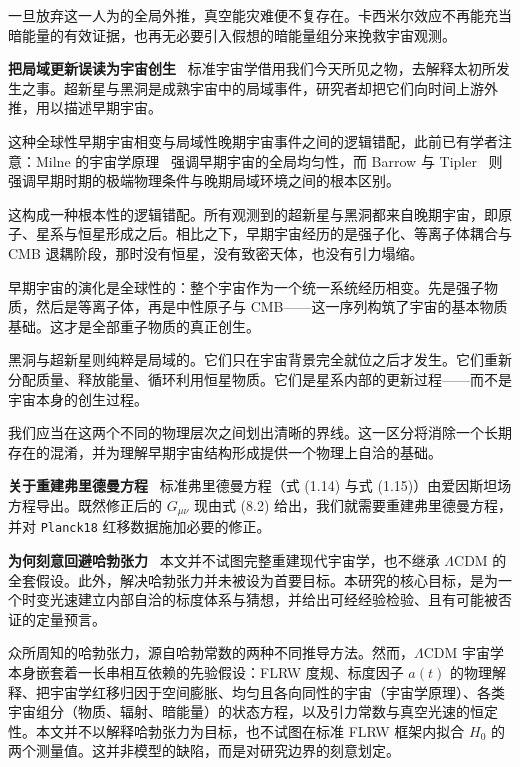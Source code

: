 \documentclass[12pt,leqno]{article}
\begin{document}
	\medskip
	一旦放弃这一人为的全局外推，真空能灾难便不复存在。卡西米尔效应不再能充当暗能量的有效证据，也再无必要引入假想的暗能量组分来挽救宇宙观测。

	
	\medskip
	\bigskip
	\textbf{把局域更新误读为宇宙创生}\,\,\,
	标准宇宙学借用我们今天所见之物，去解释太初所发生之事。超新星与黑洞是成熟宇宙中的局域事件，研究者却把它们向时间上游外推，用以描述早期宇宙。 
	
	\medskip
	这种全球性早期宇宙相变与局域性晚期宇宙事件之间的逻辑错配，此前已有学者注意：Milne 的宇宙学原理~\cite{Milne:1933} 强调早期宇宙的全局均匀性，而 Barrow 与 Tipler~\cite{Barrow:1986} 则强调早期时期的极端物理条件与晚期局域环境之间的根本区别。
	
	\medskip
	这构成一种根本性的逻辑错配。所有观测到的超新星与黑洞都来自晚期宇宙，即原子、星系与恒星形成之后。相比之下，早期宇宙经历的是强子化、等离子体耦合与 CMB 退耦阶段，那时没有恒星，没有致密天体，也没有引力塌缩。
	
	\medskip
	早期宇宙的演化是全球性的：整个宇宙作为一个统一系统经历相变。先是强子物质，然后是等离子体，再是中性原子与 CMB——这一序列构筑了宇宙的基本物质基础。这才是全部重子物质的真正创生。
	
	\medskip
	黑洞与超新星则纯粹是局域的。它们只在宇宙背景完全就位之后才发生。它们重新分配质量、释放能量、循环利用恒星物质。它们是星系内部的更新过程——而不是宇宙本身的创生过程。
	
	\medskip
	我们应当在这两个不同的物理层次之间划出清晰的界线。这一区分将消除一个长期存在的混淆，并为理解早期宇宙结构形成提供一个物理上自洽的基础。
	
	
	
	
	\medskip
	\bigskip
	\textbf{关于重建弗里德曼方程}\,\,\,
	标准弗里德曼方程（式 (1.14) 与式 (1.15)）由爱因斯坦场方程导出。既然修正后的 $G_{\mu\nu}$ 现由式 (8.2) 给出，我们就需要重建弗里德曼方程，并对 \texttt{Planck18} 红移数据施加必要的修正。
	
	
	\medskip
	\bigskip
	\textbf{为何刻意回避哈勃张力}\,\,\,
	本文并不试图完整重建现代宇宙学，也不继承 $\Lambda$CDM 的全套假设。此外，解决哈勃张力并未被设为首要目标。本研究的核心目标，是为一个时变光速建立内部自洽的标度体系与猜想，并给出可经经验检验、且有可能被否证的定量预言。
	
	\medskip
	众所周知的哈勃张力，源自哈勃常数的两种不同推导方法。然而，$\Lambda$CDM 宇宙学本身嵌套着一长串相互依赖的先验假设：FLRW 度规、标度因子 $a(t)$ 的物理解释、把宇宙学红移归因于空间膨胀、均匀且各向同性的宇宙（宇宙学原理）、各类宇宙组分（物质、辐射、暗能量）的状态方程，以及引力常数与真空光速的恒定性。本文并不以解释哈勃张力为目标，也不试图在标准 FLRW 框架内拟合 $H_0$ 的两个测量值。这并非模型的缺陷，而是对研究边界的刻意划定。
	
\end{document}
